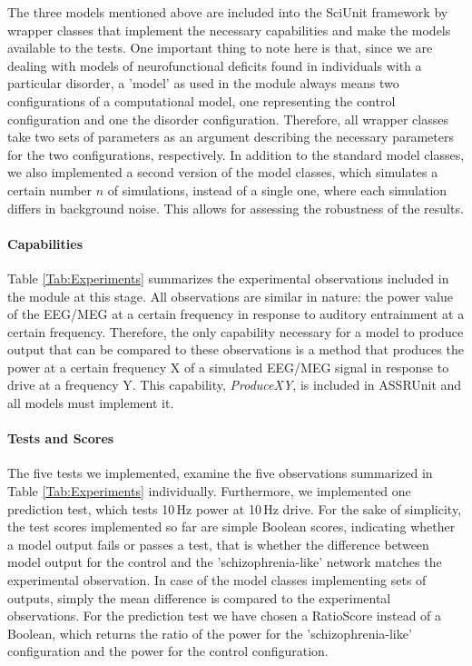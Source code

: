 \documentclass[CompPsych]{stjour}
\begin{document}
The three models mentioned above are included into the SciUnit framework by wrapper classes that implement the necessary capabilities and make the models available to the tests.
One important thing to note here is that, since we are dealing with models of neurofunctional deficits found in individuals with a particular disorder, a 'model' as used in the module always means two configurations of a computational 
model, one representing the control configuration and one the disorder configuration. Therefore, all wrapper classes take two sets of parameters as an argument describing the necessary parameters
for the two configurations, respectively.
In addition to the standard model classes, we also implemented a second version of the model classes, which simulates a certain number $n$ of simulations, instead of a single one, 
where each simulation differs in background noise. This allows for assessing the robustness of the results.


\paragraph{Capabilities}
Table \ref{Tab:Experiments} summarizes the experimental observations included in the module at this stage. All observations are similar in nature: the power value of the EEG/MEG 
at a certain frequency in response to auditory entrainment at a certain frequency. Therefore, the only capability necessary for a model to produce output that can be compared to these observations
is a method that produces the power at a certain frequency X of a simulated EEG/MEG signal in response to drive at a frequency Y. This capability, \textit{ProduceXY}, is included in ASSRUnit and all models
must implement it.

\paragraph{Tests and Scores}
The five tests we implemented, examine the five observations summarized in Table \ref{Tab:Experiments} individually. Furthermore, we implemented one 
prediction test, which tests 10\,Hz power at 10\,Hz drive.
For the sake of simplicity, the test scores implemented so far are simple Boolean scores, indicating whether a model output fails or passes a test, that is whether the difference 
between model output for the control and the 'schizophrenia-like' network
matches the experimental observation. In case of the model classes implementing sets of outputs, simply the mean difference is compared to the experimental observations.
For the prediction test we have chosen a RatioScore instead of a Boolean, which
returns the ratio of the power for the 'schizophrenia-like'  configuration and the power for the control configuration.
\end{document}
